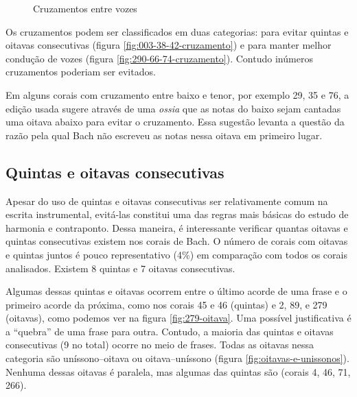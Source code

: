 \begin{figure}[!h]
  \centering
  \caption{Cruzamentos entre vozes}
  \label{fig:coral-003}
\end{figure}

Os cruzamentos podem ser classificados em duas categorias: para evitar
quintas e oitavas consecutivas (figura \ref{fig:003-38-42-cruzamento})
e para manter melhor condução de vozes (figura
\ref{fig:290-66-74-cruzamento}).  Contudo inúmeros cruzamentos
poderiam ser evitados.

Em alguns corais com cruzamento entre baixo e tenor, por exemplo 29,
35 e 76, a edição usada sugere através de uma \textit{ossia} que as
notas do baixo sejam cantadas uma oitava abaixo para evitar o
cruzamento. Essa sugestão levanta a questão da razão pela qual Bach
não escreveu as notas nessa oitava em primeiro lugar.

\subsection{Quintas e oitavas consecutivas}
\label{sec:quintas-e-oitavas}

Apesar do uso de quintas e oitavas consecutivas ser relativamente
comum na escrita instrumental, evitá-las constitui uma das regras mais
básicas do estudo de harmonia e contraponto. Dessa maneira, é
interessante verificar quantas oitavas e quintas consecutivas existem
nos corais de Bach. O número de corais com oitavas e quintas juntos é
pouco representativo (4\%) em comparação com todos os corais
analisados. Existem 8 quintas e 7 oitavas consecutivas.

Algumas dessas quintas e oitavas ocorrem entre o último acorde de uma
frase e o primeiro acorde da próxima, como nos corais 45 e 46
(quintas) e 2, 89, e 279 (oitavas), como podemos ver na figura
\ref{fig:279-oitava}. Uma possível justificativa é a ``quebra'' de uma
frase para outra. Contudo, a maioria das quintas e oitavas
consecutivas (9 no total) ocorre no meio de frases. Todas as oitavas
nessa categoria são uníssono--oitava ou oitava--uníssono (figura
\ref{fig:oitavas-e-unissonos}). Nenhuma dessas oitavas é paralela, mas
algumas das quintas são (corais 4, 46, 71, 266).

